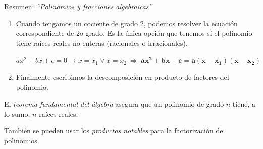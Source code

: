 \begin{myblock}{Resumen: \emph{``Polinomios y fracciones algebraicas''}}
\begin{small}
\begin{enumerate}
\vspace{-2mm}\item Cuando tengamos un cociente de grado 2, podemos resolver la ecuación correspondiente de 2o grado. Es la única opción que tenemos si el polinomio tiene raíces reales no enteras (racionales o irracionales). 

$ax^2+bx+c=0 \to x=x_1 \vee x=x_2 \ \Rightarrow \ \boldsymbol{ax^2+bx+c=a(x-x_1)(x-x_2)}$

\vspace{-2mm}\item Finalmente escribimos la descomposición en producto de factores del polinomio.
\end{enumerate}
El \emph{teorema fundamental del álgebra} asegura que un polinomio de grado $n$ tiene, a lo sumo, $n$ raíces reales.

También se pueden usar los \emph{productos notables} para la factorización de polinomios. 
\end{small}	
\end{myblock}





